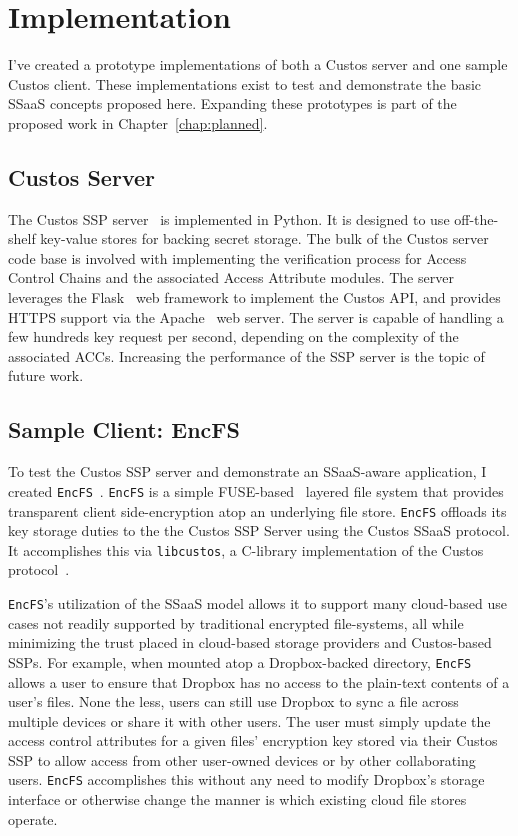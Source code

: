 \section{Implementation}

I've created a prototype implementations of both a Custos server and
one sample Custos client. These implementations exist to test and
demonstrate the basic SSaaS concepts proposed here. Expanding these
prototypes is part of the proposed work in Chapter~\ref{chap:planned}.

\subsection{Custos Server}

The Custos SSP server~\cite{custos-repo-server} is implemented in
Python. It is designed to use off-the-shelf key-value stores for
backing secret storage. The bulk of the Custos server code base is
involved with implementing the verification process for Access Control
Chains and the associated Access Attribute modules. The server
leverages the Flask~\cite{python-flask} web framework to implement the
Custos API, and provides HTTPS support via the Apache~\cite{apache}
web server. The server is capable of handling a few hundreds key
request per second, depending on the complexity of the associated
ACCs. Increasing the performance of the SSP server is the topic of
future work.

\subsection{Sample Client: EncFS}

To test the Custos SSP server and demonstrate an SSaaS-aware
application, I created
\texttt{EncFS}~\cite{custos-repo-encfs}. \texttt{EncFS} is a simple
FUSE-based~\cite{fuse} layered file system that provides transparent
client side-encryption atop an underlying file store. \texttt{EncFS}
offloads its key storage duties to the the Custos SSP Server using the
Custos SSaaS protocol. It accomplishes this via \texttt{libcustos}, a
C-library implementation of the Custos
protocol~\cite{custos-repo-libcustos}.

\texttt{EncFS}'s utilization of the SSaaS model allows it to support
many cloud-based use cases not readily supported by traditional
encrypted file-systems, all while minimizing the trust placed in
cloud-based storage providers and Custos-based SSPs. For example, when
mounted atop a Dropbox-backed directory, \texttt{EncFS} allows a user
to ensure that Dropbox has no access to the plain-text contents of a
user's files. None the less, users can still use Dropbox to sync a
file across multiple devices or share it with other users. The user
must simply update the access control attributes for a given files'
encryption key stored via their Custos SSP to allow access from other
user-owned devices or by other collaborating users. \texttt{EncFS}
accomplishes this without any need to modify Dropbox's storage
interface or otherwise change the manner is which existing cloud file
stores operate.

